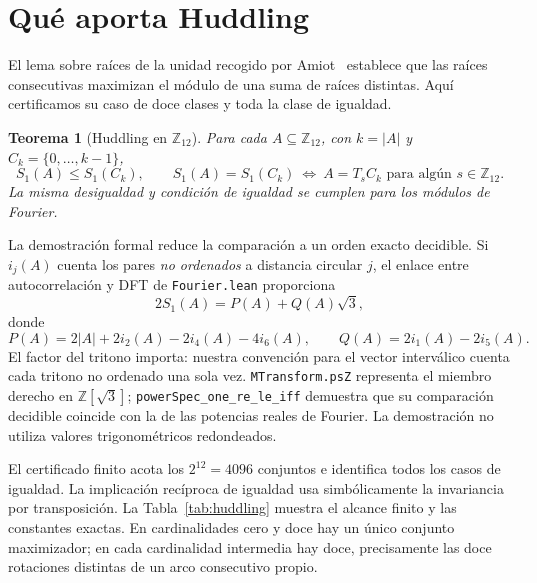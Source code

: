 \documentclass[11pt]{article}
\newtheorem{theorem}{Teorema}
\newcommand{\lean}[1]{\texttt{#1}}
\newcommand{\Ztwelve}{\mathbb{Z}_{12}}
\begin{document}
\section{Qué aporta Huddling}\label{sec:huddling}

El lema sobre raíces de la unidad recogido por Amiot~\cite[Lema~2]{Amiot2009} establece que
las raíces consecutivas maximizan el módulo de una suma de raíces distintas. Aquí
certificamos su caso de doce clases y toda la clase de igualdad.

\begin{theorem}[Huddling en $\Ztwelve$]\label{thm:huddling}
Para cada $A\subseteq\Ztwelve$, con $k=|A|$ y $C_k=\{0,\ldots,k-1\}$,
\[
 S_1(A)\le S_1(C_k),\qquad
 S_1(A)=S_1(C_k)\ \Longleftrightarrow\ A=T_sC_k\text{ para algún }s\in\Ztwelve.
\]
La misma desigualdad y condición de igualdad se cumplen para los módulos de Fourier.
\end{theorem}

La demostración formal reduce la comparación a un orden exacto decidible. Si $i_j(A)$
cuenta los pares \emph{no ordenados} a distancia circular $j$, el enlace entre
autocorrelación y DFT de \lean{Fourier.lean} proporciona
\begin{equation}\label{eq:exact}
  2S_1(A)=P(A)+Q(A)\sqrt3,
\end{equation}
donde
\[
 P(A)=2|A|+2i_2(A)-2i_4(A)-4i_6(A),\qquad
 Q(A)=2i_1(A)-2i_5(A).
\]
El factor del tritono importa: nuestra convención para el vector interválico cuenta cada
tritono no ordenado una sola vez. \lean{MTransform.psZ} representa el miembro derecho
en $\mathbb Z[\sqrt3]$; \lean{powerSpec\_one\_re\_le\_iff} demuestra que su comparación
decidible coincide con la de las potencias reales de Fourier. La demostración no utiliza
valores trigonométricos redondeados.

El certificado finito acota los $2^{12}=4096$ conjuntos e identifica todos los casos
de igualdad. La implicación recíproca de igualdad usa simbólicamente la invariancia por
transposición. La Tabla~\ref{tab:huddling} muestra el alcance finito y las constantes exactas.
En cardinalidades cero y doce hay un único conjunto maximizador; en cada cardinalidad
intermedia hay doce, precisamente las doce rotaciones distintas de un arco consecutivo propio.
\end{document}
